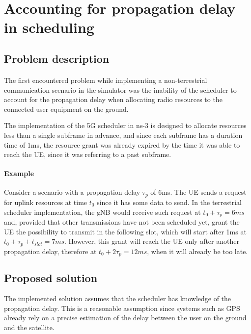 \section{Accounting for propagation delay in scheduling}

\subsection{Problem description}
\label{ss:propdelay-problem-desc}
\paragraph{}
The first encountered problem while implementing a non-terrestrial communication scenario in the simulator was the inability of the scheduler to account for the propagation delay when allocating radio resources to the connected user equipment on the ground.

The implementation of the 5G scheduler in ns-3 is designed to allocate resources less than a single subframe in advance, and since each subframe has a duration time of 1ms, the resource grant was already expired by the time it was able to reach the \ac{UE}, since it was referring to a past subframe.

\paragraph{Example} Consider a scenario with a propagation delay $\tau_p$ of 6ms. The \ac{UE} sends a request for uplink resources at time $t_0$ since it has some data to send. In the terrestrial scheduler implementation, the \ac{gNB} would receive such request at $t_0+\tau_p=6\textit{ms}$ and, provided that other transmissions have not been scheduled yet, grant the \ac{UE} the possibility to transmit in the following slot, which will start after 1ms at $t_0+\tau_p+t_{\textit{slot}}=7\textit{ms}$. However, this grant will reach the \ac{UE} only after another propagation delay, therefore at $t_0+2\tau_p=12\textit{ms}$, when it will already be too late.

\subsection{Proposed solution}
\label{ss:propdelay-problem-sol}
The implemented solution assumes that the scheduler has knowledge of the propagation delay. This is a reasonable assumption since systems such as GPS already rely on a precise estimation of the delay between the user on the ground and the satellite.

